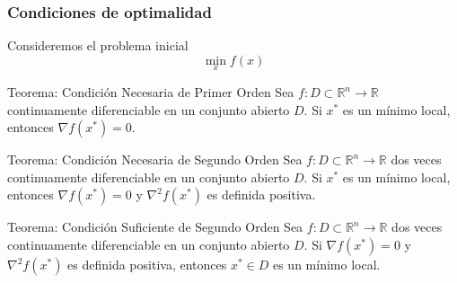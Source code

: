 \documentclass{beamer}
\begin{document}
\begin{frame}
    \frametitle{Condiciones de optimalidad}
    Consideremos el problema inicial
    \begin{equation*}
        \min_x f(x)
    \end{equation*}\pause
    \vspace{-0.5cm}
    \begin{block}{Teorema: Condición Necesaria de Primer Orden}
        Sea $f:D\subset \mathbb{R}^n \rightarrow \mathbb{R}$ continuamente diferenciable en un
        conjunto abierto $D$. Si $x^*$ es un mínimo local, entonces
        $\nabla f(x^*) = 0$.
    \end{block}\pause

    \begin{block}
        {Teorema: Condición Necesaria de Segundo Orden}
        Sea $f:D\subset \mathbb{R}^n \rightarrow \mathbb{R}$ dos veces continuamente diferenciable
        en un conjunto abierto $D$. Si $x^*$ es un mínimo local, entonces
        $\nabla f(x^*) = 0$ y $\nabla^2 f(x^*)$ es definida positiva.
    \end{block}\pause
    
    \begin{block}{Teorema: Condición Suficiente de Segundo Orden}
        Sea $f:D\subset \mathbb{R}^n \rightarrow \mathbb{R}$ dos veces continuamente diferenciable
        en un conjunto abierto $D$. Si $\nabla f(x^*) = 0$ y $\nabla^2 f(x^*)$ es definida positiva,
        entonces $x^* \in D$ es un mínimo local.
    \end{block}
\end{frame}
\end{document}
